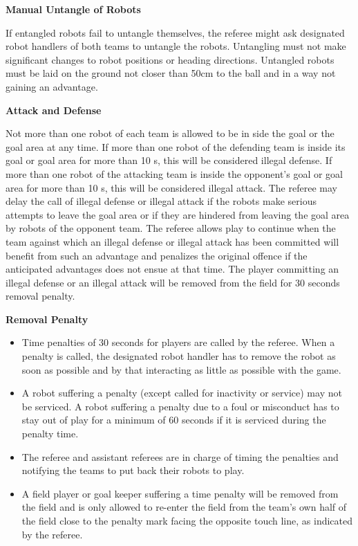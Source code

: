 {\bfseries Manual Untangle of Robots}

If entangled robots fail to untangle themselves, the referee might ask designated robot handlers of both teams to untangle the robots. Untangling must not make
significant changes to robot positions or heading directions. Untangled robots must be laid on the ground not closer than 50cm to the ball and in a way not gaining an advantage.

\bigskip

{\bfseries Attack and Defense}

Not more than one robot of each team is allowed to be in
side the goal or the goal area at any time. If more than one robot of the defending team is inside its goal or goal area for more than 10 s, this will be considered illegal defense. If more than one robot of the attacking team is inside the opponent's goal or goal area for more than 10 s, this will be considered illegal attack. The referee may delay the call of illegal defense
or illegal attack if the robots make serious attempts to leave the goal area or if they are hindered from leaving the goal area by robots of the opponent team. The referee allows play to continue when the team against
which an illegal defense or illegal attack has been committed will benefit from such an advantage and penalizes the original offence if the anticipated advantages does not ensue at that time. The player committing an illegal defense or an illegal attack will be removed from the field for 30 seconds removal penalty.

\bigskip

{\bfseries Removal Penalty}

\begin{itemize}
\item Time penalties of 30 seconds for players are called by the referee. When a penalty is called, the designated robot handler has to remove the robot as soon as possible and by that interacting as little as possible with the game. 
\item A robot suffering a penalty (except called for inactivity or service) may not be serviced. A robot suffering a penalty due to a foul or misconduct has to stay out of play for a minimum of 60 seconds if it is serviced during the penalty time.
\item The referee and assistant referees are in charge of timing the penalties and notifying the teams to put back their robots to play.
\item A field player or goal keeper suffering a time penalty will be removed from the field and is only allowed to re-enter the field from the team's own half of the field close to the penalty mark facing the opposite touch line, as indicated by the referee.
\end{itemize}

